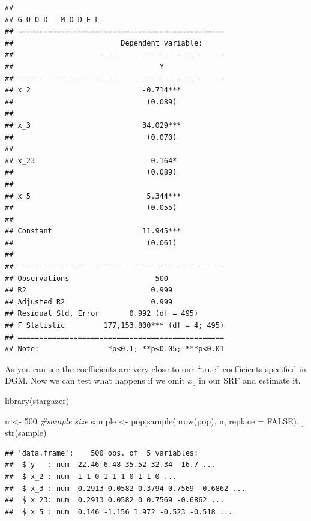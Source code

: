 \documentclass[
]{book}
\newenvironment{Shaded}{\begin{snugshade}}{\end{snugshade}}
\newcommand{\AttributeTok}[1]{\textcolor[rgb]{0.77,0.63,0.00}{#1}}
\newcommand{\CommentTok}[1]{\textcolor[rgb]{0.56,0.35,0.01}{\textit{#1}}}
\newcommand{\ConstantTok}[1]{\textcolor[rgb]{0.00,0.00,0.00}{#1}}
\newcommand{\DecValTok}[1]{\textcolor[rgb]{0.00,0.00,0.81}{#1}}
\newcommand{\FunctionTok}[1]{\textcolor[rgb]{0.00,0.00,0.00}{#1}}
\newcommand{\NormalTok}[1]{#1}
\newcommand{\OtherTok}[1]{\textcolor[rgb]{0.56,0.35,0.01}{#1}}
\begin{document}
\begin{verbatim}
## 
## G O O D - M O D E L
## ================================================
##                         Dependent variable:     
##                     ----------------------------
##                                  Y              
## ------------------------------------------------
## x_2                          -0.714***          
##                               (0.089)           
##                                                 
## x_3                          34.029***          
##                               (0.070)           
##                                                 
## x_23                          -0.164*           
##                               (0.089)           
##                                                 
## x_5                           5.344***          
##                               (0.055)           
##                                                 
## Constant                     11.945***          
##                               (0.061)           
##                                                 
## ------------------------------------------------
## Observations                    500             
## R2                             0.999            
## Adjusted R2                    0.999            
## Residual Std. Error       0.992 (df = 495)      
## F Statistic         177,153.800*** (df = 4; 495)
## ================================================
## Note:                *p<0.1; **p<0.05; ***p<0.01
\end{verbatim}

As you can see the coefficients are very close to our ``true'' coefficients specified in DGM. Now we can test what happens if we omit \(x_5\) in our SRF and estimate it.

\begin{Shaded}
\begin{Highlighting}[]
\FunctionTok{library}\NormalTok{(stargazer)}

\NormalTok{n }\OtherTok{\textless{}{-}} \DecValTok{500} \CommentTok{\#sample size}
\NormalTok{sample }\OtherTok{\textless{}{-}}\NormalTok{ pop[}\FunctionTok{sample}\NormalTok{(}\FunctionTok{nrow}\NormalTok{(pop), n, }\AttributeTok{replace =} \ConstantTok{FALSE}\NormalTok{), ]}
\FunctionTok{str}\NormalTok{(sample)}
\end{Highlighting}
\end{Shaded}

\begin{verbatim}
## 'data.frame':    500 obs. of  5 variables:
##  $ y   : num  22.46 6.48 35.52 32.34 -16.7 ...
##  $ x_2 : num  1 1 0 1 1 1 0 1 1 0 ...
##  $ x_3 : num  0.2913 0.0582 0.3794 0.7569 -0.6862 ...
##  $ x_23: num  0.2913 0.0582 0 0.7569 -0.6862 ...
##  $ x_5 : num  0.146 -1.156 1.972 -0.523 -0.518 ...
\end{verbatim}
\end{document}
